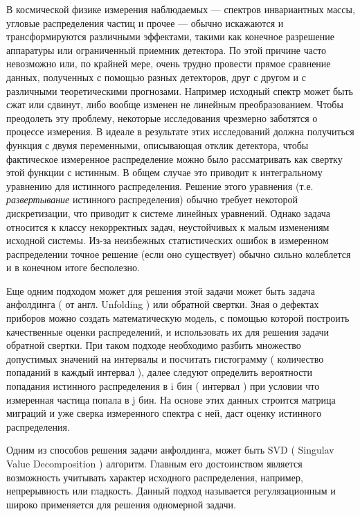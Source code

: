 \documentclass[a4paper,12pt]{diplom}
\begin{document}
\tableofcontents[Содержание]



В космической физике измерения наблюдаемых — спектров инвариантных массы, угловые распределения частиц и прочее — обычно искажаются 
и трансформируются различными эффектами, такими как конечное разрешение аппаратуры или ограниченный приемник детектора. По этой причине 
часто невозможно или, по крайней мере, очень трудно провести прямое сравнение данных, полученных с помощью разных детекторов, друг с другом 
и с различными теоретическими прогнозами. Например исходный спектр может быть сжат или сдвинут, либо вообще изменен не линейным преобразованием. 
Чтобы преодолеть эту проблему, некоторые исследования чрезмерно заботятся о процессе измерения. В идеале в результате этих исследований должна 
получиться функция с двумя переменными, описывающая отклик детектора, чтобы фактическое измеренное распределение можно было рассматривать как 
свертку этой функции с истинным. В общем случае это приводит к интегральному уравнению для истинного распределения. Решение этого уравнения 
(т.е. \textit{развертывание} истинного распределения) обычно требует некоторой дискретизации, что приводит к системе линейных уравнений. 
Однако задача относится к классу некорректных задач, неустойчивых к малым изменениям исходной системы. Из-за неизбежных статистических 
ошибок в измеренном распределении точное решение (если оно существует) обычно сильно колеблется и в конечном итоге бесполезно. 

Еще одним подходом может для решения этой задачи может быть задача анфолдинга ( от англ. Unfolding ) или обратной свертки. Зная о дефектах 
приборов можно создать математическую модель, с помощью которой построить качественные оценки распределений, и использовать их для решения 
задачи обратной свертки. При таком подходе необходимо разбить множество допустимых значений на интервалы и посчитать гистограмму 
( количество попаданий в каждый интервал ), далее следуют определить вероятности попадания истинного распределения в i бин ( интервал ) 
при условии что измеренная частица попала в j бин. На основе этих данных строится матрица миграций и уже сверка измеренного спектра с ней, 
даст оценку истинного распределения.

Одним из способов решения задачи анфолдинга, может быть SVD ( Singulav Value Decomposition ) алгоритм. Главным его достоинством является
возможность учитывать характер исходного распределения, например, непрерывность или гладкость. Данный подход называется регулязационным
и широко применяется для решения одномерной задачи.
\end{document}
